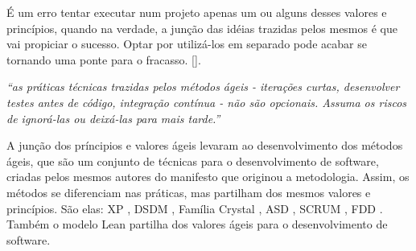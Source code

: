 \documentclass[10pt,a4paper,font=plain]{abnt}
\begin{document}
É um erro tentar executar num projeto apenas um ou alguns desses valores e princípios, quando na verdade, a junção das idéias trazidas pelos mesmos é que vai propiciar o sucesso. Optar por utilizá-los em separado pode acabar se tornando uma ponte para o fracasso. [].

\begin{center}\textit{``as práticas técnicas trazidas pelos métodos ágeis - iterações curtas, desenvolver testes antes de código, integração contínua - não são opcionais. Assuma os riscos de ignorá-las ou deixá-las para mais tarde.''}  \end{center}

A junção dos príncipios e valores ágeis levaram ao desenvolvimento dos métodos ágeis, que são um conjunto de técnicas para o desenvolvimento de software, criadas pelos mesmos autores do manifesto que originou a metodologia. Assim,  os métodos se diferenciam nas práticas, mas partilham dos mesmos valores e princípios. São elas: XP \cite{XPExplained}, DSDM \cite{DSDM}, Família Crystal \cite{Crystal}, ASD \cite{ASD}, SCRUM \cite{ScrumXP}, FDD . Também o modelo Lean \cite{Lean} partilha dos valores ágeis para o desenvolvimento de software.
\end{document}
